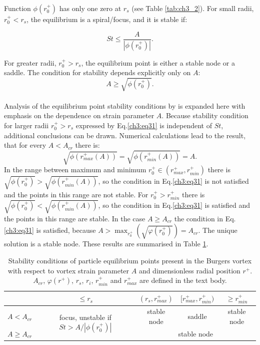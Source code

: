\documentclass[../main.tex]{subfiles}
\begin{document}
Function $\phi(r^+_0)$ has only one zero at $r_s$ (see Table \ref{tab:ch3_2}). For small radii, $r^+_0<r_s$, the equilibrium is a spiral/focus, and it is stable if:

\begin{equation}
St \leq \frac{A}{|{\phi(r^+_0)}|}.
\label{ch3:eq30}
\end{equation}

\noindent For greater radii, $r^+_0>r_s$, the equilibrium point is either a stable node or a saddle. The condition for stability depends explicitly only on $A$:
\begin{equation}
A \geq \sqrt{\phi(r^+_0)}.
\label{ch3:eq31}
\end{equation}
\\
Analysis of the equilibrium point stability conditions by \citet{Marcu1995} is expanded here with emphasis on the dependence on strain parameter $A$.  Because stability condition for larger radii $r^+_0 > r_s$ expressed by Eq.\ref{ch3:eq31} is independent of $St$, additional conclusions can be drawn. Numerical calculations lead to the result, that for every $A<A_{cr}$ there is:
\begin{equation}
\sqrt{\phi(r^+_{max}(A))}=\sqrt{\phi(r^+_{min}(A))}=A.
\label{ch3:eq32}
\end{equation}
In the range between maximum and minimum $r^+_0 \in (r^+_{max},r^+_{min})$ there is $\sqrt{\phi(r^+_0)} > \sqrt{\phi(r^+_{min}(A))}$, so the condition in Eq.\ref{ch3:eq31} is not satisfied and the points in this range are not stable. For $r^+_0 >r^+_{min}$ there is 
$\sqrt{\phi(r^+_0)} <\sqrt{\phi(r^+_{min}(A))}$, so the condition in Eq.\ref{ch3:eq31} is satisfied and the points in this range are stable.
In the case $A \geq A_{cr}$ the condition in Eq.\ref{ch3:eq31} is satisfied, because $A>\max_{r^+_0}\left( \sqrt{\varphi(r^+_0)}\right)=A_{cr}$. The unique solution is a stable node. These results are summarised in Table \ref{tab:ch3_3}.

\begin{table}
\small
\tabcolsep=0.2cm
\caption{Stability conditions of particle equilibrium points present in the Burgers vortex with respect to vortex strain parameter $A$ and dimensionless radial position $r^+$. $A_{cr}$, $\varphi(r^+)$, $r_s$, $r_i$, $r^+_{min}$ and $r^+_{max}$ are defined in the text body.}
\centering
\begin{tabular}{|l|c|c|c|c|}
\hline 
 & $ \leq r_s$ & $(r_s,r^+_{max})$ & $[r^+_{max}, r^+_{min})$ & $\geq r^+_{min}$ \\
\hline
$A < A_{cr}$ & \multirow{2}{*}{focus, unstable if $St>A/|\phi(r^+_0)|$} & stable node & saddle & stable node\\
\cline{3-5}
$A \geq A_{cr}$ &  \multirow{2}{*}{\ } & \multicolumn{3}{|c|}{stable node}\\
\hline
\end{tabular}
\label{tab:ch3_3}
\end{table}
 
\end{document}
